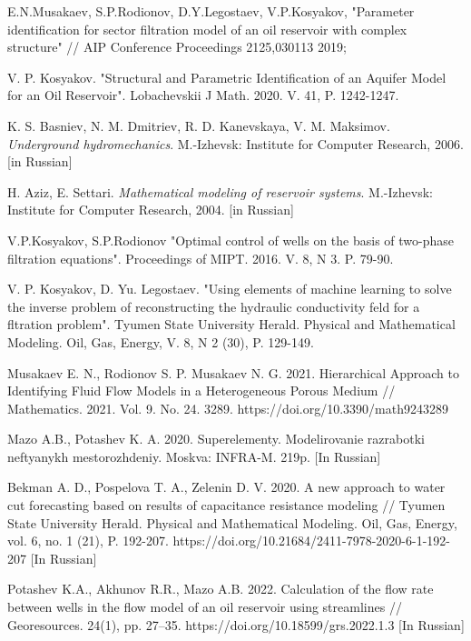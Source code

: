 \documentclass{article}
\begin{document}
\begin{thebibliography}{20}
	
 E.N.Musakaev, S.P.Rodionov, D.Y.Legostaev, V.P.Kosyakov, "Parameter identification for sector filtration model of an oil reservoir with complex structure" // AIP Conference Proceedings 2125,030113 2019;

 V. P. Kosyakov. "Structural and Parametric Identification of an Aquifer Model for an Oil Reservoir". Lobachevskii J Math. 2020. V. 41, P. 1242-1247.

 K. S. Basniev, N. M. Dmitriev, R. D. Kanevskaya, V. M. Maksimov. \textit{Underground hydromechanics}. M.-Izhevsk: Institute for Computer Research, 2006. [in Russian]

 H. Aziz, E. Settari. \textit{Mathematical modeling of reservoir systems}.  M.-Izhevsk: Institute for Computer Research, 2004. [in Russian]

 V.P.Kosyakov, S.P.Rodionov "Optimal control of wells on the basis of two-phase filtration equations". Proceedings of MIPT. 2016. V. 8, N 3. P. 79-90.

 V. P. Kosyakov,  D. Yu. Legostaev. "Using elements of machine learning to
solve the inverse problem of reconstructing the hydraulic conductivity feld for a fltration
problem". Tyumen State University Herald. Physical and Mathematical Modeling. Oil, Gas,
Energy, V. 8, N 2 (30), P. 129-149.

 Musakaev E. N., Rodionov S. P. Musakaev N. G. 2021. Hierarchical Approach to Identifying Fluid Flow Models in a Heterogeneous Porous Medium // Mathematics. 2021. Vol. 9. No. 24. 3289. https://doi.org/10.3390/math9243289

 Mazo A.B., Potashev K. A. 2020. Superelementy. Modelirovanie razrabotki neftyanykh mestorozhdeniy. Moskva: INFRA-M. 219p. [In Russian]

 Bekman A. D., Pospelova T. A., Zelenin D. V. 2020. A new approach to water cut forecasting based on results of capacitance resistance modeling // Tyumen State University Herald. Physical and Mathematical Modeling. Oil, Gas, Energy, vol. 6, no. 1 (21), P. 192-207. https://doi.org/10.21684/2411-7978-2020-6-1-192-207 [In Russian]

 Potashev K.A., Akhunov R.R., Mazo A.B. 2022. Calculation of the flow rate between wells in the flow model of an oil reservoir using streamlines // Georesources. 24(1), pp. 27–35. https://doi.org/10.18599/grs.2022.1.3 [In Russian]


\end{thebibliography}
\end{document}
